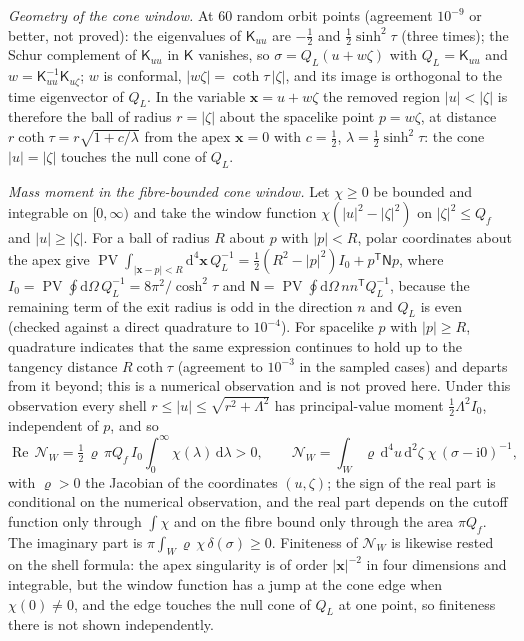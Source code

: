 \emph{Geometry of the cone window.} At \(60\) random orbit points (agreement \(10^{-9}\) or better, not proved): the eigenvalues of \(\mathsf K_{uu}\) are \(-\tfrac12\) and \(\tfrac12\sinh^2\tau\) (three times); the Schur complement of \(\mathsf K_{uu}\) in \(\mathsf K\) vanishes, so \(\sigma=Q_L(u+w\zeta)\) with \(Q_L=\mathsf K_{uu}\) and \(w=\mathsf K_{uu}^{-1}\mathsf K_{u\zeta}\); \(w\) is conformal, \(|w\zeta|=\coth\tau\,|\zeta|\), and its image is orthogonal to the time eigenvector of \(Q_L\). In the variable \(\boldsymbol x=u+w\zeta\) the removed region \(|u|<|\zeta|\) is therefore the ball of radius \(r=|\zeta|\) about the spacelike point \(p=w\zeta\), at distance \(r\coth\tau=r\sqrt{1+c/\lambda}\) from the apex \(\boldsymbol x=0\) with \(c=\tfrac12\), \(\lambda=\tfrac12\sinh^2\tau\): the cone \(|u|=|\zeta|\) touches the null cone of \(Q_L\).

\emph{Mass moment in the fibre-bounded cone window.} Let \(\chi\ge0\) be bounded and integrable on \([0,\infty)\) and take the window function \(\chi(|u|^2-|\zeta|^2)\) on \(|\zeta|^2\le Q_f\) and \(|u|\ge|\zeta|\). For a ball of radius \(R\) about \(p\) with \(|p|<R\), polar coordinates about the apex give \(\operatorname{PV}\!\int_{|\boldsymbol x-p|<R}\mathrm d^4\boldsymbol x\,Q_L^{-1}=\tfrac12(R^2-|p|^2)I_0+p^{\mathsf T}\mathsf Np\), where \(I_0=\operatorname{PV}\oint\mathrm d\Omega\,Q_L^{-1}=8\pi^2/\cosh^2\tau\) and \(\mathsf N=\operatorname{PV}\oint\mathrm d\Omega\,nn^{\mathsf T}Q_L^{-1}\), because the remaining term of the exit radius is odd in the direction \(n\) and \(Q_L\) is even (checked against a direct quadrature to \(10^{-4}\)). For spacelike \(p\) with \(|p|\ge R\), quadrature indicates that the same expression continues to hold up to the tangency distance \(R\coth\tau\) (agreement to \(10^{-3}\) in the sampled cases) and departs from it beyond; this is a numerical observation and is not proved here. Under this observation every shell \(r\le|u|\le\sqrt{r^2+\Lambda^2}\) has principal-value moment \(\tfrac12\Lambda^2I_0\), independent of \(p\), and so
\[
  \operatorname{Re}\,\mathcal N_W=\tfrac12\,\varrho\,\pi Q_f\,I_0\int_0^\infty\chi(\lambda)\,\mathrm d\lambda>0 ,\qquad
  \mathcal N_W=\int_W\varrho\,\mathrm d^4u\,\mathrm d^2\zeta\;\chi\,(\sigma-\mathrm i0)^{-1},
\]
with \(\varrho>0\) the Jacobian of the coordinates \((u,\zeta)\); the sign of the real part is conditional on the numerical observation, and the real part depends on the cutoff function only through \(\int\chi\) and on the fibre bound only through the area \(\pi Q_f\). The imaginary part is \(\pi\int_W\varrho\,\chi\,\delta(\sigma)\ge0\). Finiteness of \(\mathcal N_W\) is likewise rested on the shell formula: the apex singularity is of order \(|\boldsymbol x|^{-2}\) in four dimensions and integrable, but the window function has a jump at the cone edge when \(\chi(0)\ne0\), and the edge touches the null cone of \(Q_L\) at one point, so finiteness there is not shown independently.

